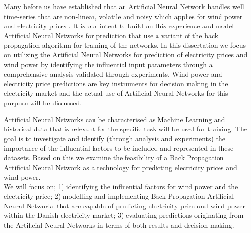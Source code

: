 Many before us have established that an Artificial Neural Network handles well time-series that are non-linear, volatile and noisy which applies for wind power and electricity prices \cite{stockForecasting,pjmForecast,yamin2004adaptive,windForecastPortugal}. It is our intent to build on this experience and model Artificial Neural Networks for prediction that use a variant of the back propagation algorithm for training of the networks. In this dissertation we focus on utilizing the Artificial Neural Networks for prediction of electricity prices and wind power by identifying the influential input parameters through a comprehensive analysis validated through experiments. Wind power and electricity price predictions are key instruments for decision making in the electricity market\cite{dayAheadImpactOfWindPowerForecasts,21} and the actual use of Artificial Neural Networks for this purpose will be discussed.  

Artificial Neural Networks can be characterised as Machine Learning\cite{18} and historical data that is relevant for the specific task will be used for training. The goal is to investigate and identify (through analysis and experiments) the importance of the influential factors to be included and represented in these datasets. Based on this we examine the feasibility of a Back Propagation Artificial Neural Network as a technology for predicting electricity prices and wind power.
\\[0.5cm]
We will focus on; 1) identifying the influential factors for wind power and the electricity price; 2) modelling and implementing Back Propagation Artificial Neural Networks that are capable of predicting electricity price and wind power within the Danish electricity market; 3) evaluating predictions originating from the Artificial Neural Networks in terms of both results and decision making.
